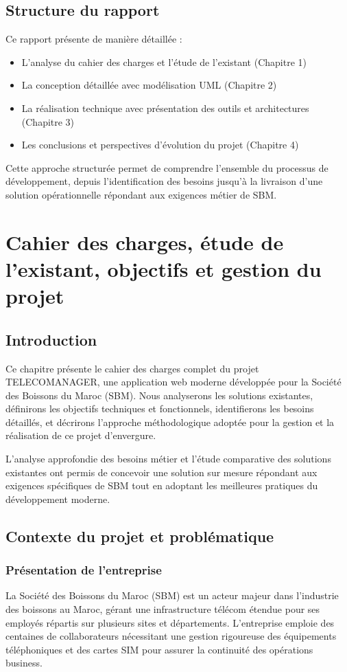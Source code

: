 \documentclass[12pt,a4paper]{report}
\begin{document}
\section{Structure du rapport}
Ce rapport présente de manière détaillée :
\begin{itemize}
\item L'analyse du cahier des charges et l'étude de l'existant (Chapitre 1)
\item La conception détaillée avec modélisation UML (Chapitre 2)  
\item La réalisation technique avec présentation des outils et architectures (Chapitre 3)
\item Les conclusions et perspectives d'évolution du projet (Chapitre 4)
\end{itemize}

Cette approche structurée permet de comprendre l'ensemble du processus de développement, depuis l'identification des besoins jusqu'à la livraison d'une solution opérationnelle répondant aux exigences métier de SBM.
\chapter{Cahier des charges, étude de l'existant, objectifs et gestion du projet}

\section{Introduction}
Ce chapitre présente le cahier des charges complet du projet TELECOMANAGER, une application web moderne développée pour la Société des Boissons du Maroc (SBM). Nous analyserons les solutions existantes, définirons les objectifs techniques et fonctionnels, identifierons les besoins détaillés, et décrirons l'approche méthodologique adoptée pour la gestion et la réalisation de ce projet d'envergure.


L'analyse approfondie des besoins métier et l'étude comparative des solutions existantes ont permis de concevoir une solution sur mesure répondant aux exigences spécifiques de SBM tout en adoptant les meilleures pratiques du développement moderne.

\section{Contexte du projet et problématique}

\subsection{Présentation de l'entreprise}
La Société des Boissons du Maroc (SBM) est un acteur majeur dans l'industrie des boissons au Maroc, gérant une infrastructure télécom étendue pour ses employés répartis sur plusieurs sites et départements. L'entreprise emploie des centaines de collaborateurs nécessitant une gestion rigoureuse des équipements téléphoniques et des cartes SIM pour assurer la continuité des opérations business.
\end{document}
